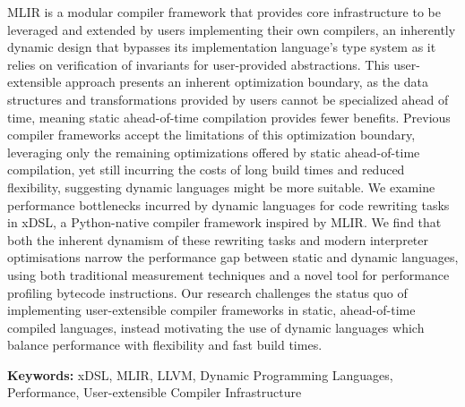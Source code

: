 MLIR is a modular compiler framework that provides core infrastructure to be leveraged and extended by users implementing their own compilers, an inherently dynamic design that bypasses its implementation language's type system as it relies on verification of invariants for user-provided abstractions.
This user-extensible approach presents an inherent optimization boundary, as the data structures and transformations provided by users cannot be specialized ahead of time, meaning static ahead-of-time compilation provides fewer benefits.
Previous compiler frameworks accept the limitations of this optimization boundary, leveraging only the remaining optimizations offered by static ahead-of-time compilation, yet still incurring the costs of long build times and reduced flexibility, suggesting dynamic languages might be more suitable.
We examine performance bottlenecks incurred by dynamic languages for code rewriting tasks in xDSL, a Python-native compiler framework inspired by MLIR.
We find that both the inherent dynamism of these rewriting tasks and modern interpreter optimisations narrow the performance gap between static and dynamic languages, using both traditional measurement techniques and a novel tool for performance profiling bytecode instructions.
Our research challenges the status quo of implementing user-extensible compiler frameworks in static, ahead-of-time compiled languages, instead motivating the use of dynamic languages which balance performance with flexibility and fast build times.

\ifsubmission
\else
\vspace{1em}

\textbf{Keywords: } xDSL, MLIR, LLVM, Dynamic Programming Languages, Performance, User-extensible Compiler Infrastructure
\fi
